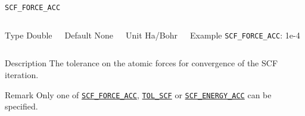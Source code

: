 \documentclass[xcolor=dvipsnames,t]{beamer}
\begin{document}
\begin{frame}[allowframebreaks]{\texttt{SCF\_FORCE\_ACC}} \label{SCF_FORCE_ACC}
\vspace*{-12pt}
\begin{columns}
\begin{block}{Type}
Double
\end{block}

\begin{block}{Default}
None
\end{block}

\begin{block}{Unit}
Ha/Bohr
\end{block}

\begin{block}{Example}
\texttt{SCF\_FORCE\_ACC}: 1e-4
\end{block}
\end{columns}

\begin{block}{Description}
The tolerance on the atomic forces for convergence of the SCF iteration. 
\end{block}

\begin{block}{Remark}
Only one of \hyperlink{SCF_FORCE_ACC}{\texttt{SCF\_FORCE\_ACC}}, \hyperlink{TOL_SCF}{\texttt{TOL\_SCF}} or \hyperlink{SCF_ENERGY_ACC}{\texttt{SCF\_ENERGY\_ACC}} can be specified.
\end{block}

\end{frame}
\end{document}
